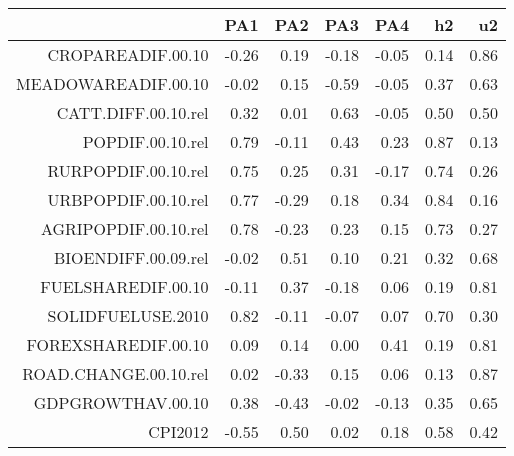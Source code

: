 \begin{table}[ht]
\centering
\begin{tabular}{rrrrrrr}
  \hline
 & PA1 & PA2 & PA3 & PA4 & h2 & u2 \\ 
  \hline
CROPAREADIF.00.10 & -0.26 & 0.19 & -0.18 & -0.05 & 0.14 & 0.86 \\ 
  MEADOWAREADIF.00.10 & -0.02 & 0.15 & -0.59 & -0.05 & 0.37 & 0.63 \\ 
  CATT.DIFF.00.10.rel & 0.32 & 0.01 & 0.63 & -0.05 & 0.50 & 0.50 \\ 
  POPDIF.00.10.rel & 0.79 & -0.11 & 0.43 & 0.23 & 0.87 & 0.13 \\ 
  RURPOPDIF.00.10.rel & 0.75 & 0.25 & 0.31 & -0.17 & 0.74 & 0.26 \\ 
  URBPOPDIF.00.10.rel & 0.77 & -0.29 & 0.18 & 0.34 & 0.84 & 0.16 \\ 
  AGRIPOPDIF.00.10.rel & 0.78 & -0.23 & 0.23 & 0.15 & 0.73 & 0.27 \\ 
  BIOENDIFF.00.09.rel & -0.02 & 0.51 & 0.10 & 0.21 & 0.32 & 0.68 \\ 
  FUELSHAREDIF.00.10 & -0.11 & 0.37 & -0.18 & 0.06 & 0.19 & 0.81 \\ 
  SOLIDFUELUSE.2010 & 0.82 & -0.11 & -0.07 & 0.07 & 0.70 & 0.30 \\ 
  FOREXSHAREDIF.00.10 & 0.09 & 0.14 & 0.00 & 0.41 & 0.19 & 0.81 \\ 
  ROAD.CHANGE.00.10.rel & 0.02 & -0.33 & 0.15 & 0.06 & 0.13 & 0.87 \\ 
  GDPGROWTHAV.00.10 & 0.38 & -0.43 & -0.02 & -0.13 & 0.35 & 0.65 \\ 
  CPI2012 & -0.55 & 0.50 & 0.02 & 0.18 & 0.58 & 0.42 \\ 
   \hline
\end{tabular}
\end{table}
